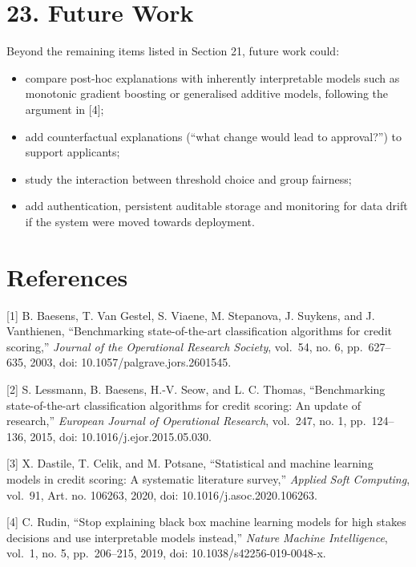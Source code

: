 \documentclass[
  11pt,
]{article}
\providecommand{\tightlist}{%
  \setlength{\itemsep}{0pt}\setlength{\parskip}{0pt}}
\begin{document}
\hypertarget{future-work}{%
\section{23. Future Work}\label{future-work}}

Beyond the remaining items listed in Section 21, future work could:

\begin{itemize}
\tightlist
\item
  compare post-hoc explanations with inherently interpretable models
  such as monotonic gradient boosting or generalised additive models,
  following the argument in {[}4{]};
\item
  add counterfactual explanations (``what change would lead to
  approval?'') to support applicants;
\item
  study the interaction between threshold choice and group fairness;
\item
  add authentication, persistent auditable storage and monitoring for
  data drift if the system were moved towards deployment.
\end{itemize}

\hypertarget{references}{%
\section{References}\label{references}}

{[}1{]} B. Baesens, T. Van Gestel, S. Viaene, M. Stepanova, J. Suykens,
and J. Vanthienen, ``Benchmarking state-of-the-art classification
algorithms for credit scoring,'' \emph{Journal of the Operational
Research Society}, vol.~54, no. 6, pp.~627--635, 2003, doi:
10.1057/palgrave.jors.2601545.

{[}2{]} S. Lessmann, B. Baesens, H.-V. Seow, and L. C. Thomas,
``Benchmarking state-of-the-art classification algorithms for credit
scoring: An update of research,'' \emph{European Journal of Operational
Research}, vol.~247, no. 1, pp.~124--136, 2015, doi:
10.1016/j.ejor.2015.05.030.

{[}3{]} X. Dastile, T. Celik, and M. Potsane, ``Statistical and machine
learning models in credit scoring: A systematic literature survey,''
\emph{Applied Soft Computing}, vol.~91, Art. no. 106263, 2020, doi:
10.1016/j.asoc.2020.106263.

{[}4{]} C. Rudin, ``Stop explaining black box machine learning models
for high stakes decisions and use interpretable models instead,''
\emph{Nature Machine Intelligence}, vol.~1, no. 5, pp.~206--215, 2019,
doi: 10.1038/s42256-019-0048-x.
\end{document}
